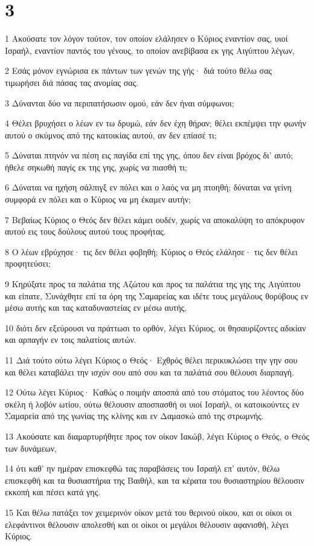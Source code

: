 \chapter{3}

\par 1 Ακούσατε τον λόγον τούτον, τον οποίον ελάλησεν ο Κύριος εναντίον σας, υιοί Ισραήλ, εναντίον παντός του γένους, το οποίον ανεβίβασα εκ γης Αιγύπτου λέγων,
\par 2 Εσάς μόνον εγνώρισα εκ πάντων των γενών της γής· διά τούτο θέλω σας τιμωρήσει διά πάσας τας ανομίας σας.
\par 3 Δύνανται δύο να περιπατήσωσιν ομού, εάν δεν ήναι σύμφωνοι;
\par 4 Θέλει βρυχήσει ο λέων εν τω δρυμώ, εάν δεν έχη θήραν; θέλει εκπέμψει την φωνήν αυτού ο σκύμνος από της κατοικίας αυτού, αν δεν επίασέ τι;
\par 5 Δύναται πτηνόν να πέση εις παγίδα επί της γης, όπου δεν είναι βρόχος δι' αυτό; ήθελε σηκωθή παγίς εκ της γης, χωρίς να πιασθή τι;
\par 6 Δύναται να ηχήση σάλπιγξ εν πόλει και ο λαός να μη πτοηθή; δύναται να γείνη συμφορά εν πόλει και ο Κύριος να μη έκαμεν αυτήν;
\par 7 Βεβαίως Κύριος ο Θεός δεν θέλει κάμει ουδέν, χωρίς να αποκαλύψη το απόκρυφον αυτού εις τους δούλους αυτού τους προφήτας.
\par 8 Ο λέων εβρύχησε· τις δεν θέλει φοβηθή; Κύριος ο Θεός ελάλησε· τις δεν θέλει προφητεύσει;
\par 9 Κηρύξατε προς τα παλάτια της Αζώτου και προς τα παλάτια της γης της Αιγύπτου και είπατε, Συνάχθητε επί τα όρη της Σαμαρείας και ιδέτε τους μεγάλους θορύβους εν μέσω αυτής και τας καταδυναστείας εν μέσω αυτής,
\par 10 διότι δεν εξεύρουσι να πράττωσι το ορθόν, λέγει Κύριος, οι θησαυρίζοντες αδικίαν και αρπαγήν εν τοις παλατίοις αυτών.
\par 11 Διά τούτο ούτω λέγει Κύριος ο Θεός· Εχθρός θέλει περικυκλώσει την γην σου και θέλει καταβάλει την ισχύν σου από σου και τα παλάτιά σου θέλουσι διαρπαγή.
\par 12 Ούτω λέγει Κύριος· Καθώς ο ποιμήν αποσπά από του στόματος του λέοντος δύο σκέλη ή λοβόν ωτίου, ούτω θέλουσιν αποσπασθή οι υιοί Ισραήλ, οι κατοικούντες εν Σαμαρεία από της γωνίας της κλίνης και εν Δαμασκώ από της στρωμνής.
\par 13 Ακούσατε και διαμαρτυρήθητε προς τον οίκον Ιακώβ, λέγει Κύριος ο Θεός, ο Θεός των δυνάμεων,
\par 14 ότι καθ' ην ημέραν επισκεφθώ τας παραβάσεις του Ισραήλ επ' αυτόν, θέλω επισκεφθή και τα θυσιαστήρια της Βαιθήλ, και τα κέρατα του θυσιαστηρίου θέλουσιν εκκοπή και πέσει κατά γης.
\par 15 Και θέλω πατάξει τον χειμερινόν οίκον μετά του θερινού οίκου, και οι οίκοι οι ελεφάντινοι θέλουσιν απολεσθή και οι οίκοι οι μεγάλοι θέλουσιν αφανισθή, λέγει Κύριος.

